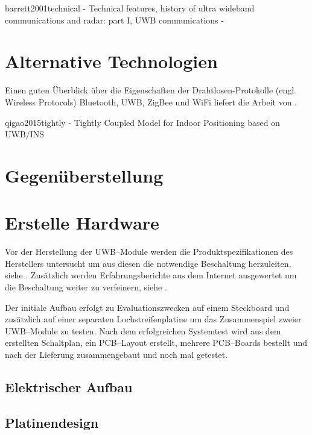 barrett2001technical - Technical features, history of ultra wideband communications and radar: part I, UWB communications
	- \cite{barrett2001technical}

	

\section{Alternative Technologien}

Einen guten Überblick über die Eigenschaften der Drahtlosen-Protokolle (engl. Wireless Protocols) Bluetooth, UWB, ZigBee und WiFi liefert die Arbeit \cite{lee2007comparative} von \citeauthor{lee2007comparative}.

qigao2015tightly - Tightly Coupled Model for Indoor Positioning based on UWB/INS



\section{Gegenüberstellung}


\section{Erstelle Hardware}

Vor der Herstellung der UWB--Module werden die Produktspezifikationen des Herstellers untersucht um aus diesen die notwendige Beschaltung herzuleiten, siehe \cite{decawave2016dwm1kdatasheet, decawave2013power}. Zusätzlich werden Erfahrungsberichte aus dem Internet ausgewertet um die Beschaltung weiter zu verfeinern, siehe \cite{Trojer2015, Holder2016, Holder2016a}.

Der initiale Aufbau erfolgt zu Evaluationszwecken auf einem Steckboard und zusätzlich auf einer separaten Lochstreifenplatine um das Zusammenspiel zweier UWB--Module zu testen. Nach dem erfolgreichen Systemtest wird aus dem erstellten Schaltplan, ein PCB--Layout erstellt, mehrere PCB--Boards bestellt und nach der Lieferung zusammengebaut und noch mal getestet.


\subsection{Elektrischer Aufbau}


\subsection{Platinendesign}


